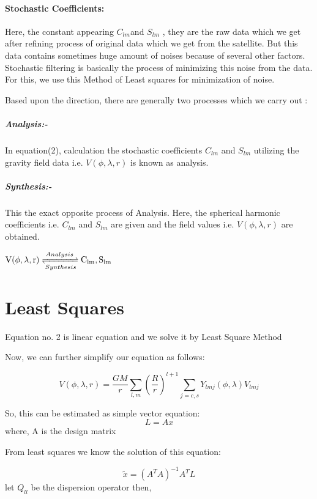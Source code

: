 \documentclass[a4paper,12pt]{article}
\begin{document}
\paragraph{Stochastic Coefficients:} 
Here, the constant appearing $C_{lm}$and $S_{lm}$ , they are the raw data which we get after refining process of original data which we get from the satellite. But this data contains sometimes huge amount of noises because of several other factors. Stochastic filtering is basically the process of minimizing this noise from the data. For this, we use this Method of Least squares for minimization of noise.

Based upon the direction, there are generally two processes which we carry out :

\subparagraph{Analysis:- }  In equation(2), calculation the stochastic coefficients $C_{lm} $ and $S_{lm}$ utilizing the gravity field data i.e. $V(\phi,\lambda,r)$ is known as analysis.
 \subparagraph{Synthesis:- } This the exact opposite process of Analysis. Here, the spherical harmonic coefficients i.e.  $C_{lm} $ and $S_{lm}$ are given and the field values i.e. $V(\phi,\lambda,r)$ are obtained. \\

\centerline{
$\mathrm{V(\phi,\lambda,r)} \xrightleftharpoons[Synthesis]{Analysis} \mathrm{C_{lm}, S_{lm}}$
}

\section{Least Squares}
Equation no. 2 is linear equation and we solve it by Least Square Method

Now, we can further simplify our equation as follows:

\begin{equation}
V(\phi,\lambda,r)=\frac{GM}{r}\sum_{l,m}^{} \left(\frac{R}{r}\right)^{l+1}\sum_{j=c,s}^{}  Y_{lmj} (\phi,\lambda) V_{lmj}
\end{equation}

So, this can be estimated as simple vector equation:
\begin{equation}
  L= Ax  
\end{equation}
where, A is the design matrix

From least squares we know the solution of this equation:

\begin{equation}
\tilde{x} =(A^T A)^{-1} A^T L
\end{equation}
let $ Q_{ll}$ be the dispersion operator
then,
\end{document}

